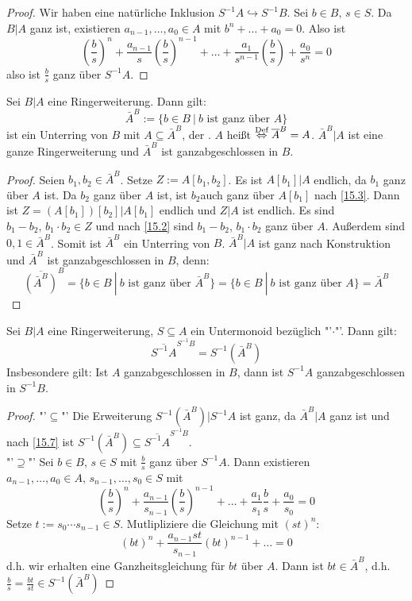 \begin{proof}
	Wir haben eine natürliche Inklusion $S^{-1}A \hookrightarrow S^{-1}B$. Sei $b\in B, \, s\in S$. Da $B|A$ ganz ist, existieren $a_{n-1}, \ldots, a_0\in A$ mit $b^n + \ldots + a_0 =0$. Also ist 
	$$\left(\frac{b}{s}\right)^n + \frac{a_{n-1}}{s} \left(\frac{b}{s}\right)^{n-1} + \ldots + \frac{a_1}{s^{n-1}}\left(\frac{b}{s}\right)+ \frac{a_0}{s^n} =0$$
	also ist $\frac{b}{s}$ ganz über $S^{-1}A$.
\end{proof}
\begin{bem+df}\label{15.8}
	Sei $B|A$ eine Ringerweiterung. Dann gilt:
	$$\bar A^B:= \{b\in B \ | \ b\text{ ist ganz über } A\}$$
	ist ein Unterring von $B$ mit $A\subseteq \bar A^B$, der . $A$ heißt  $\overset{\text{Def}}{\Leftrightarrow} \overline A^B =A$. $\bar A^B|A$ ist eine ganze Ringerweiterung und $\bar A^B$ ist ganzabgeschlossen in $B$. 
\end{bem+df}
\begin{proof}
	Seien $b_1, b_2\in \bar A^B$. Setze $Z:= A[b_1,b_2]$. Es ist $A[b_1]|A$ endlich, da $b_1$ ganz über $A$ ist. Da $b_2$ ganz über $A$ ist, ist $b_2$auch ganz über $A[b_1]$ nach \ref{15.3}. Dann ist $Z= (A[b_1])[b_2]|A[b_1]$ endlich und $Z|A$ ist endlich. Es sind $b_1-b_2, \, b_1\cdot b_2\in Z$ und nach \ref{15.2} sind $b_1-b_2, \, b_1\cdot b_2$ ganz über $A$. Außerdem sind $0,1\in \bar A^B$. Somit ist $\bar A^B$ ein Unterring von $B$. $\bar A^B|A$ ist ganz nach Konstruktion und $\bar A^B$ ist ganzabgeschlossen in $B$, denn:
	$$\overline{(\bar A^B)}^B = \{b\in B \ | \ b\text{ ist ganz über } \bar A^B\} = \{b\in B \ | \ b\text{ ist ganz über }A \} = \bar A^B$$
\end{proof}
\begin{bem}\label{15.9}
	Sei $B|A$ eine Ringerweiterung, $S\subseteq A$ ein Untermonoid bezüglich "'$\cdot$"'. Dann gilt: $$\overline{S^{-1}A}^{S^{-1}B} = S^{-1}( \bar A^B)$$ Insbesondere gilt: Ist $A$ ganzabgeschlossen in $B$, dann ist $S^{-1}A$ ganzabgeschlossen in $S^{-1}B$.
\end{bem}
\begin{proof}
	"'$\subseteq$"' Die Erweiterung $S^{-1}(\bar A^B)|S^{-1}A$ ist ganz, da $\bar A^B|A$ ganz ist und nach \ref{15.7} ist $S^{-1}(\bar A^B) \subseteq \overline{S^{-1}A}^{S^{-1}B}$.\\
	"'$\supseteq$"' Sei $b\in B$, $s\in S$ mit $\frac{b}{s}$ ganz über $S^{-1}A$. Dann existieren $a_{n-1}, \ldots, a_0\in A, \, s_{n-1}, \ldots, s_0\in S$ mit
	$$\left(\frac{b}{s}\right)^n + \frac{a_{n-1}}{s_{n-1}}\left( \frac{b}{s}\right)^{n-1} + \ldots + \frac{a_1}{s_1} \frac{b}{s} + \frac{a_0}{s_0} =0$$
	Setze $t:= s_0 \cdots s_{n-1}\in S$. Mutlipliziere die Gleichung mit $(st)^n$:
	$$(bt)^n + \frac{a_{n-1}st}{s_{n-1}}(bt)^{n-1}+ \ldots =0$$
	d.h. wir erhalten eine Ganzheitsgleichung für $bt$ über $A$. Dann ist $bt\in \bar A^B$, d.h. $\frac{b}{s} = \frac{bt}{st} \in S^{-1}( \bar A^B)$
\end{proof}

